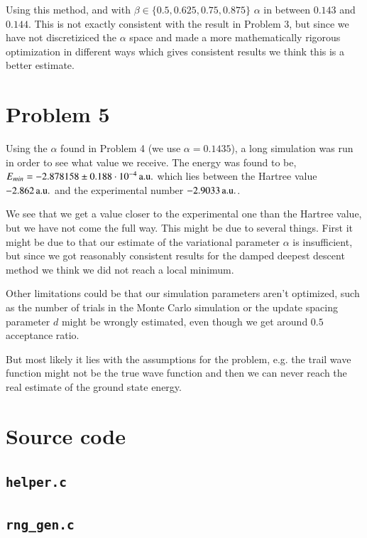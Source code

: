 Using this method, and with $\beta \in \{0.5,0.625,0.75,0.875\}$ $\alpha$ in between $0.143$ and $0.144$. This is not exactly consistent with the result in Problem 3, but since we have not discretiziced the $\alpha$ space and made a more mathematically rigorous optimization in different ways which gives consistent results we think this is a better estimate.



\section*{Problem 5}

Using the $\alpha$ found in Problem 4 (we use $\alpha=0.1435$), a long simulation was run in order to see what value we receive. The energy was found to be, $E_{min}=\unit[-2.878158\pm 0.188 \cdot 10^{-4}]{a.u.}$ which lies between the Hartree value $\unit[-2.862]{a.u.}$ and the experimental number $\unit[-2.9033]{a.u.}$.

We see that we get a value closer to the experimental one than the Hartree value, but we have not come the full way. This might be due to several things. First it might be due to that our estimate of the variational parameter $\alpha$ is insufficient, but since we got reasonably consistent results for the damped deepest descent method we think we did not reach a local minimum.

Other limitations could be that our simulation parameters aren't optimized, such as the number of trials in the Monte Carlo simulation or the update spacing parameter $d$ might be wrongly estimated, even though we get around $0.5$ acceptance ratio.

But most likely it lies with the assumptions for the problem, e.g. the trail wave function might not be the true wave function and then we can never reach the real estimate of the ground state energy.






\appendix
\section{Source code}
\subsection{\texttt{helper.c}}


\subsection{\texttt{rng\_gen.c}}


